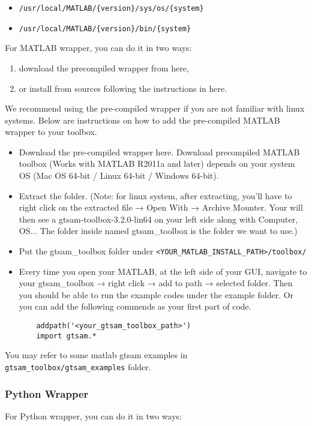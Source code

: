 \documentclass[tp]{lcc}
\begin{document}
\begin{itemize}
    \item \texttt{/usr/local/MATLAB/\{version\}/sys/os/\{system\}}
    \item \texttt{/usr/local/MATLAB/\{version\}/bin/\{system\}}
\end{itemize}

For MATLAB wrapper, you can do it in two ways:

\begin{enumerate}
    \item download the precompiled wrapper from here,
    \item or install from sources following the instructions in here.
\end{enumerate}

We recommend using the pre-compiled wrapper if you are not familiar with linux systems. Below are instructions on how to add the pre-compiled MATLAB wrapper to your toolbox.

\begin{itemize}
    \item Download the pre-compiled wrapper here. Download precompiled MATLAB toolbox (Works with MATLAB R2011a and later) depends on your system OS (Mac OS 64-bit / Linux 64-bit / Windows 64-bit).
    \item Extract the folder. (Note: for linux system, after extracting, you'll have to right click on the extracted file → Open With → Archive Mounter. Your will then see a gtsam-toolbox-3.2.0-lin64 on your left side along with Computer, OS... The folder inside named gtsam\_toolbox is the folder we want to use.)
    \item Put the gtsam\_toolbox folder under \texttt{<YOUR\_MATLAB\_INSTALL\_PATH>/toolbox/}
    \item Every time you open your MATLAB, at the left side of your GUI, navigate to your gtsam\_toolbox → right click → add to path → selected folder. Then you should be able to run the example codes under the example folder. Or you can add the following commends as your first part of code.
    \begin{verbatim}
    addpath('<your_gtsam_toolbox_path>')
    import gtsam.*
    \end{verbatim}
\end{itemize}

You may refer to some matlab gtsam examples in \texttt{gtsam\_toolbox/gtsam\_examples} folder.

\subsubsection{Python Wrapper}
For Python wrapper, you can do it in two ways:
\end{document}
